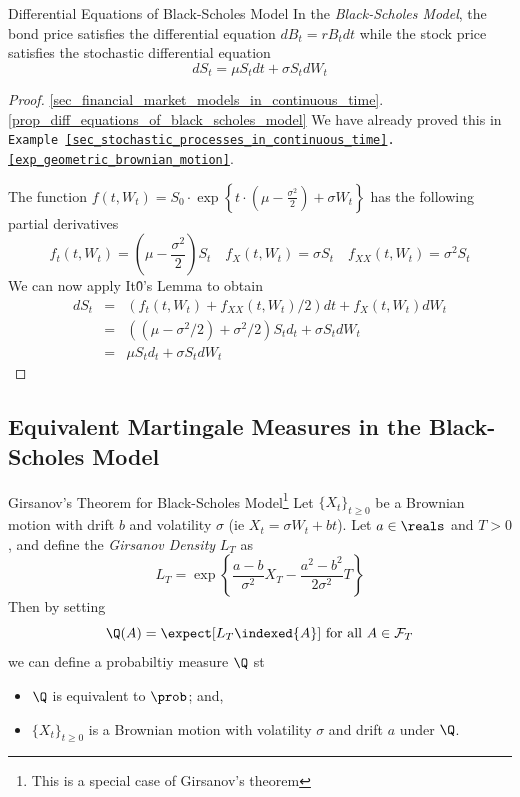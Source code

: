 \documentclass[11pt,a4paper]{article}
\begin{document}
  \begin{proposition}{Differential Equations of Black-Scholes Model}\label{prop_diff_equations_of_black_scholes_model}
    In the \textit{Black-Scholes Model}, the bond price satisfies the differential equation $dB_t=rB_tdt$ while the stock price satisfies the stochastic differential equation
    \[ dS_t=\mu S_tdt+\sigma S_tdW_t \]
  \end{proposition}

  \begin{proof}{\ref{sec_financial_market_models_in_continuous_time}.\ref{prop_diff_equations_of_black_scholes_model}}
    We have already proved this in \texttt{Example \ref{sec_stochastic_processes_in_continuous_time}.\ref{exp_geometric_brownian_motion}}.
    \par The function $f(t,W_t)=S_0\cdot\exp\left\{t\cdot\left(\mu-\frac{\sigma^2}2\right)+\sigma W_t\right\}$ has the following partial derivatives
    \[ f_t(t,W_t)=(\mu-\frac{\sigma^2}2)S_t\quad f_X(t,W_t)=\sigma S_t\quad f_{XX}(t,W_t)=\sigma^2S_t \]
    We can now apply It\^0's Lemma to obtain
    \[\begin{array}{rcl}
      dS_t&=&(f_t(t,W_t)+f_{XX}(t,W_t)/2)dt+f_X(t,W_t)dW_t\\
      &=&\left((\mu-\sigma^2/2)+\sigma^2/2\right)S_td_t+\sigma S_tdW_t\\
      &=&\mu S_td_t+\sigma S_tdW_t
    \end{array}\]
  \end{proof}

\subsection{Equivalent Martingale Measures in the Black-Scholes Model}

  \begin{theorem}{Girsanov's Theorem for Black-Scholes Model\footnote{This is a special case of Girsanov's theorem}}\label{the_girsanov_theorem}
    Let $\{X_t\}_{t\geq0}$ be a Brownian motion with drift $b$ and volatility $\sigma$ (ie $X_t=\sigma W_t+bt$). Let $a\in\reals$ and $T>0$, and define the \textit{Girsanov Density} $L_T$ as
    \[ L_T=\exp\left\{\frac{a-b}{\sigma^2}X_T-\frac{a^2-b^2}{2\sigma^2}T\right\} \]
    Then by setting
    \[ \Q(A)=\expect[L_T\indexed\{A\}]\text{ for all }A\in\mathcal{F}_T \]
    we can define a probabiltiy measure $\Q$ st
    \begin{itemize}
      \item $\Q$ is equivalent to $\prob$; and,
      \item $\{X_t\}_{t\geq0}$ is a Brownian motion with volatility $\sigma$ and drift $a$ under $\Q$.
    \end{itemize}
  \end{theorem}
\end{document}
